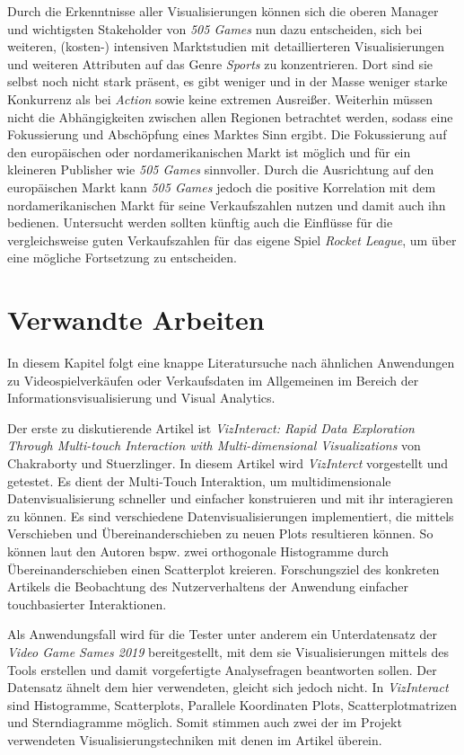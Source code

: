 \documentclass[usegeometry=true]{scrartcl}
\begin{document}
Durch die Erkenntnisse aller Visualisierungen können sich die oberen Manager und wichtigsten Stakeholder von \textit{505 Games} nun dazu entscheiden, sich bei weiteren, (kosten-) intensiven Marktstudien mit detaillierteren Visualisierungen und weiteren Attributen auf das Genre \textit{Sports} zu konzentrieren. 
Dort sind sie selbst noch nicht stark präsent, es gibt weniger und in der Masse weniger starke Konkurrenz als bei \textit{Action} sowie keine extremen Ausreißer. 
Weiterhin müssen nicht die Abhängigkeiten zwischen allen Regionen betrachtet werden, sodass eine Fokussierung und Abschöpfung eines Marktes Sinn ergibt. 
Die Fokussierung auf den europäischen oder nordamerikanischen Markt ist möglich und für ein kleineren Publisher wie \textit{505 Games} sinnvoller. 
Durch die Ausrichtung auf den europäischen Markt kann \textit{505 Games} jedoch die positive Korrelation mit dem nordamerikanischen Markt für seine Verkaufszahlen nutzen und damit auch ihn bedienen.
Untersucht werden sollten künftig auch die Einflüsse für die vergleichsweise guten Verkaufszahlen für das eigene Spiel \textit{Rocket League}, um über eine mögliche Fortsetzung zu entscheiden.
 
\section{Verwandte Arbeiten}
In diesem Kapitel folgt eine knappe Literatursuche nach ähnlichen Anwendungen zu Videospielverkäufen oder Verkaufsdaten im Allgemeinen im Bereich der Informationsvisualisierung und Visual Analytics. 

Der erste zu diskutierende Artikel ist \textit{VizInteract: Rapid Data Exploration Through Multi-touch Interaction with Multi-dimensional Visualizations} von Chakraborty und Stuerzlinger.\cite{Chakraborty.2021}
In diesem Artikel wird \textit{VizInterct} vorgestellt und getestet. 
Es dient der Multi-Touch Interaktion, um multidimensionale Datenvisualisierung schneller und einfacher konstruieren und mit ihr interagieren zu können.
Es sind verschiedene Datenvisualisierungen implementiert, die mittels Verschieben und Übereinanderschieben zu neuen Plots resultieren können. 
So können laut den Autoren bspw. zwei orthogonale Histogramme durch Übereinanderschieben einen Scatterplot kreieren. 
Forschungsziel des konkreten Artikels die Beobachtung des Nutzerverhaltens der Anwendung einfacher touchbasierter Interaktionen.

Als Anwendungsfall wird für die Tester unter anderem ein Unterdatensatz der \textit{Video Game Sames 2019} bereitgestellt, mit dem sie Visualisierungen mittels des Tools erstellen und damit vorgefertigte Analysefragen beantworten sollen.
Der Datensatz ähnelt dem hier verwendeten, gleicht sich jedoch nicht. 
In \textit{VizInteract} sind Histogramme, Scatterplots, Parallele Koordinaten Plots, Scatterplotmatrizen und Sterndiagramme möglich. 
Somit stimmen auch zwei der im Projekt verwendeten Visualisierungstechniken mit denen im Artikel überein. 
\end{document}

